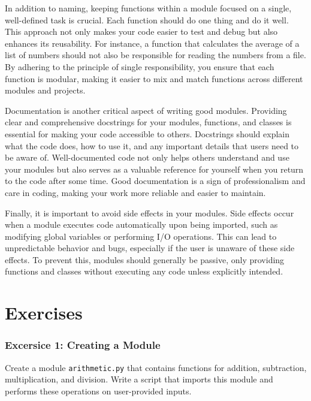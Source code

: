 \documentclass[
  letterpaper,
  DIV=11,
  numbers=noendperiod]{scrreprt}
\begin{document}
In addition to naming, keeping functions within a module focused on a
single, well-defined task is crucial. Each function should do one thing
and do it well. This approach not only makes your code easier to test
and debug but also enhances its reusability. For instance, a function
that calculates the average of a list of numbers should not also be
responsible for reading the numbers from a file. By adhering to the
principle of single responsibility, you ensure that each function is
modular, making it easier to mix and match functions across different
modules and projects.

Documentation is another critical aspect of writing good modules.
Providing clear and comprehensive docstrings for your modules,
functions, and classes is essential for making your code accessible to
others. Docstrings should explain what the code does, how to use it, and
any important details that users need to be aware of. Well-documented
code not only helps others understand and use your modules but also
serves as a valuable reference for yourself when you return to the code
after some time. Good documentation is a sign of professionalism and
care in coding, making your work more reliable and easier to maintain.

Finally, it is important to avoid side effects in your modules. Side
effects occur when a module executes code automatically upon being
imported, such as modifying global variables or performing I/O
operations. This can lead to unpredictable behavior and bugs, especially
if the user is unaware of these side effects. To prevent this, modules
should generally be passive, only providing functions and classes
without executing any code unless explicitly intended.

\hypertarget{exercises-5}{%
\section{Exercises}\label{exercises-5}}

\hypertarget{excersice-1-creating-a-module}{%
\subsubsection{Excersice 1: Creating a
Module}\label{excersice-1-creating-a-module}}

Create a module \texttt{arithmetic.py} that contains functions for
addition, subtraction, multiplication, and division. Write a script that
imports this module and performs these operations on user-provided
inputs.
\end{document}
